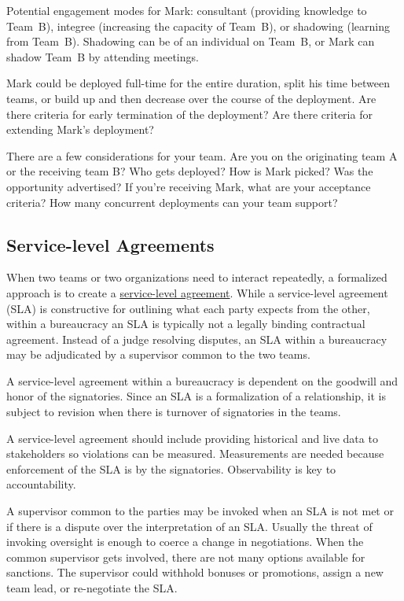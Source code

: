 Potential engagement modes for Mark: consultant (providing knowledge to Team~B), integree (increasing the capacity of Team~B), or shadowing (learning from Team~B). Shadowing can be of an individual on Team~B, or Mark can shadow Team~B by attending meetings. 


Mark could be deployed full-time for the entire duration, split his time between teams, or build up and then decrease over the course of the deployment.
Are there criteria for early termination of the deployment? Are there criteria for extending Mark's deployment?

There are a few considerations for your team. Are you on the originating team A or the receiving team B? Who gets deployed? How is Mark picked? Was the opportunity advertised? If you're receiving Mark, what are your acceptance criteria? How many concurrent deployments can your team support?


\subsection*{Service-level Agreements\label{sec:sla}}

When two teams or two organizations need to interact repeatedly, a formalized approach is to create a \href{https://en.wikipedia.org/wiki/Service-level_agreement}{service-level agreement}. 
While a service-level agreement (SLA) is constructive for outlining what each party expects from the other, within a bureaucracy an SLA is typically not a legally binding contractual agreement. Instead of a judge resolving disputes, an SLA within a bureaucracy may be adjudicated by a supervisor common to the two teams.

A service-level agreement within a bureaucracy is dependent on the goodwill and honor of the signatories. Since an SLA is a formalization of a relationship, it is subject to revision when there is turnover of signatories in the teams. 

A service-level agreement should include providing historical and live data to stakeholders so violations can be measured. Measurements are needed because enforcement of the SLA is by the signatories. Observability is key to accountability. 

A supervisor common to the parties may be invoked when an SLA is not met or if there is a dispute over the interpretation of an SLA. Usually the threat of invoking oversight is enough to coerce a change in negotiations. 
When the common supervisor gets involved, there are not many options available for sanctions. The supervisor could withhold bonuses or promotions,  assign a new team lead, or re-negotiate the SLA. 

